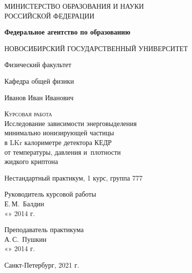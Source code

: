 \begin{titlepage}
  \begin{center}
    \large
    МИНИСТЕРСТВО ОБРАЗОВАНИЯ И НАУКИ\\ РОССИЙСКОЙ ФЕДЕРАЦИИ

    \textbf{Федеральное агентство по образованию}
    \vspace{0.5cm}

    НОВОСИБИРСКИЙ ГОСУДАРСТВЕННЫЙ УНИВЕРСИТЕТ
    \vspace{0.25cm}

    Физический факультет

    Кафедра общей физики
    \vfill


    Иванов Иван Иванович
    \vfill

    \textsc{Курсовая работа}\\[5mm]

    {\LARGE Исследование зависимости энерговыделения\\
      минимально ионизирующей частицы\\
    в LKr калориметре детектора КЕДР\\
    от температуры, давления и~плотности\\[2mm]
    жидкого криптона}
  \bigskip

    Нестандартный практикум, 1 курс, группа 777
\end{center}
\vfill

\newlength{\ML}
\hfill\begin{minipage}{0.4\textwidth}
  Руководитель курсовой работы\\
  \underline{\hspace{\ML}} Е.\,М.~Балдин\\
  «\underline{\hspace{0.7cm}}» \underline{\hspace{2cm}} 2014 г.
\end{minipage}%
\bigskip

\hfill\begin{minipage}{0.4\textwidth}
  Преподаватель практикума\\
  \underline{\hspace{\ML}} А.\,С.~Пушкин\\
  «\underline{\hspace{0.7cm}}» \underline{\hspace{2cm}} 2014 г.
\end{minipage}%
\vfill

\begin{center}
  Санкт-Петербург, 2021 г.
\end{center}
\end{titlepage}
